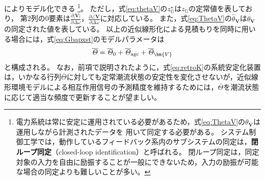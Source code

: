 \documentclass[tombow,dvipdfmx]{corona-a5-1.1}
\begin{document}
によりモデル化できる
\footnote{
電力系統は常に安定に運用されている必要があるため，式\ref{eq:ThetaV}の$\theta_{\bm{V}}$は運用しながら計測されたデータを
用いて同定する必要がある。
システム制御工学では，動作しているフィードバック系内のサブシステムの同定は，\textbf{閉ループ同定}（closed-loop identification）と呼ばれる\cite{ljung1998system}。
閉ループ同定は，同定対象の入力を自由に励振することが一般にできないため，入力の励振が可能な場合の同定よりも難しいことが多い。
}。
ただし，式\ref{eq:thetaV}の$z_{\mathds G}^{\star}$は$z_{\mathds G}$の定常値を表しており，
第2列の0要素は$\tfrac{\partial |\bm{V}| }{\partial \Delta \omega}$，$\tfrac{\partial \angle \bm{V} }{\partial \Delta \omega}$に対応している。
また，式\ref{eq:ThetaV}の$\hat{\theta}_{\bm{V}}$は$\theta_{\bm{V}}$の同定された値を表している。
以上の近似線形化による見積もりを同時に用いる場合には，式\ref{eq:Gbapxst}のモデルパラメータは
\[
\overline{\mathit{\Theta}}=
\overline{\mathit{\Theta}}_{0}+
\overline{\mathit{\Theta}}_{\rm agc}+
\overline{\mathit{\Theta}}_{\bm{V}}
\]
と構成される。
なお，前項で説明されたように，式\ref{eq:retroK}の系統安定化装置は，いかなる行列$\overline{\mathit{\Theta}}$に対しても定常潮流状態の安定性を変化させないが，近似線形環境モデルによる相互作用信号の予測精度を維持するためには，$\overline{\mathit{\Theta}}$を潮流状態に応じて適当な頻度で更新することが望ましい。


\newpage
%
%
\end{document}
